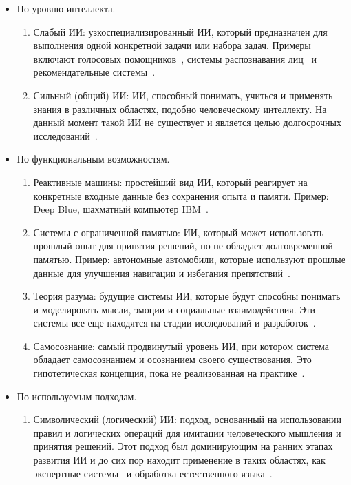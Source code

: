 \begin{itemize}[leftmargin=2.5em, label=\textbullet]
    \item По уровню интеллекта. \begin{enumerate}[leftmargin=2.5em]
        \item Слабый ИИ: узкоспециализированный ИИ, который предназначен для выполнения одной конкретной задачи или набора задач. Примеры включают голосовых помощников~\cite{yang, huang, liu}, системы распознавания лиц~\cite{jha, ali, adjabi} и рекомендательные системы~\cite{azeroual, roy, zhang}.
        \item Сильный (общий) ИИ: ИИ, способный понимать, учиться и применять знания в различных областях, подобно человеческому интеллекту. На данный момент такой ИИ не существует и является целью долгосрочных исследований~\cite{buttazzo, butz, hoffmann}.
    \end{enumerate}
    \item По функциональным возможностям. \begin{enumerate}[leftmargin=2.5em]
        \item Реактивные машины: простейший вид ИИ, который реагирует на конкретные входные данные без сохранения опыта и памяти. Пример: Deep Blue, шахматный компьютер IBM~\cite{newborn}.
        \item Системы с ограниченной памятью: ИИ, который может использовать прошлый опыт для принятия решений, но не обладает долговременной памятью. Пример: автономные автомобили, которые используют прошлые данные для улучшения навигации и избегания препятствий~\cite{lai, padmaja, mahmoud, liy}.
        \item Теория разума: будущие системы ИИ, которые будут способны понимать и моделировать мысли, эмоции и социальные взаимодействия. Эти системы все еще находятся на стадии исследований и разработок~\cite{cuzzolin, williams}.
        \item Самосознание: самый продвинутый уровень ИИ, при котором система обладает самосознанием и осознанием своего существования. Это гипотетическая концепция, пока не реализованная на практике~\cite{chella, li, butlin}.
    \end{enumerate}
    \item По используемым подходам. \begin{enumerate}[leftmargin=2.5em]
        \item Символический (логический) ИИ: подход, основанный на использовании правил и логических операций для имитации человеческого мышления и принятия решений. Этот подход был доминирующим на ранних этапах развития ИИ и до сих пор находит применение в таких областях, как экспертные системы~\cite{calegari, belle, luo} и обработка естественного языка~\cite{hamilton, liuz, aithal}.

\end{enumerate}
\end{itemize}
